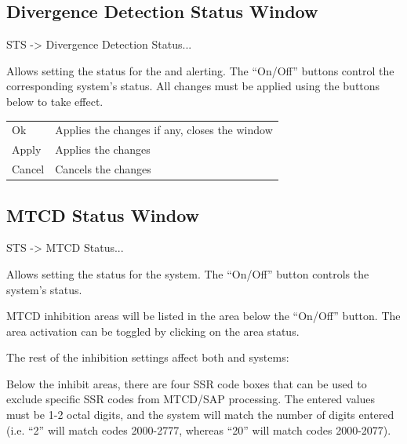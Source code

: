 \documentclass[a4paper,oneside,11pt]{memoir}
\begin{document}
\subsection{Divergence Detection Status Window}
\label{win:ddsw}

 STS -> Divergence Detection Status...

\bigskip


Allows setting the status for the  and  alerting. The “On/Off” buttons control the corresponding system’s status. All changes must be applied using the buttons below to take effect.

\begin{longtable}{p{2.5cm} p{10cm}}
    Ok      & Applies the changes if any, closes the window\\
    Apply   & Applies the changes\\
    Cancel  & Cancels the changes\\
\end{longtable}

\subsection{MTCD Status Window}
\label{win:mtcdsw}

 STS -> MTCD Status...

\bigskip


Allows setting the status for the  system. The “On/Off” button controls the system’s status.

\bigskip

MTCD inhibition areas will be listed in the area below the “On/Off” button. The area activation can be toggled by clicking on the area status.

\bigskip

The rest of the inhibition settings affect both  and  systems:

\bigskip

Below the inhibit areas, there are four SSR code boxes that can be used to exclude specific SSR codes from MTCD/SAP processing. The entered values must be 1-2 octal digits, and the system will match the number of digits entered (i.e. “2” will match codes 2000-2777, whereas “20” will match codes 2000-2077).
\end{document}
